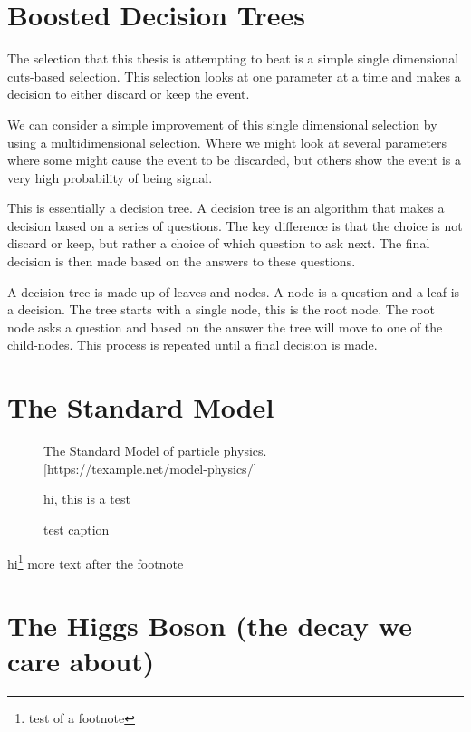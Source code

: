 \documentclass{tufte-book}
\begin{document}
\chapter{Boosted Decision Trees}

The selection that this thesis is attempting to beat is a simple single dimensional cuts-based selection. This selection looks at one parameter at a time and makes a decision to either discard or keep the event.

We can consider a simple improvement of this single dimensional selection by using a multidimensional selection. Where we might look at several parameters where some might cause the event to be discarded, but others show the event is a very high probability of being signal.

This is essentially a decision tree. A decision tree is an algorithm that makes a decision based on a series of questions. The key difference is that the choice is not discard or keep, but rather a choice of which question to ask next. The final decision is then made based on the answers to these questions.

A decision tree is made up of leaves and nodes. A node is a question and a leaf is a decision. The tree starts with a single node, this is the root node. The root node asks a question and based on the answer the tree will move to one of the child-nodes. This process is repeated until a final decision is made.









\chapter{The Standard Model}

\begin{figure}
    \centering
    
    \caption{The Standard Model of particle physics.[https://texample.net/model-physics/]}
\end{figure}

\begin{figure}
    \centering
    hi, this is a test
    \caption{test caption}
\end{figure}

hi\footnote{test of a footnote} more text after the footnote


\chapter{The Higgs Boson (the decay we care about)}
\end{document}
